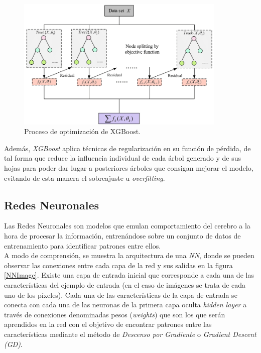             \begin{figure}[h]
                \centering
                \includegraphics[width=10cm]{archivos/3.Tecnologias/XGBoost/XGBoostFlowImage}
                \caption{Proceso de optimización de XGBoost.}
                \label{XGBoostFlowImage}
             \end{figure}

            
            Además, \textit{XGBoost} aplica técnicas de regularización en su función de pérdida, de tal forma que reduce la influencia individual de cada árbol generado y de sus hojas para poder dar lugar a posteriores árboles que consigan mejorar el modelo, evitando de esta manera el sobreajuste u \textit{overfitting}.



        \subsection {Redes Neuronales}

            Las Redes Neuronales \cite{NNReview} son modelos que emulan comportamiento del cerebro a la hora de procesar la información, entrenándose sobre un conjunto de datos de entrenamiento para identificar patrones entre ellos.\\

            A modo de comprensión, se muestra la arquitectura de una \textit{NN}, donde se pueden observar las conexiones entre cada capa de la red y sus salidas en la figura \ref{NNImage}. Existe una capa de entrada inicial que corresponde a cada una de las características del ejemplo de entrada (en el caso de imágenes se trata de cada uno de los píxeles). Cada una de las características de la capa de entrada se conecta con cada una de las neuronas de la primera capa oculta \textit{hidden layer} a través de conexiones denominadas pesos (\textit{weights}) que son los que serán aprendidos en la red con el objetivo de encontrar patrones entre las características mediante el método de \textit{Descenso por Gradiente} o \textit{Gradient Descent (GD)}.\\



